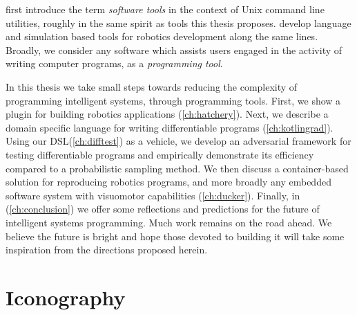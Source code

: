 %
\citet{kernighan1976software} first introduce the term \textit{software tools} in the context of Unix command line utilities, roughly in the same spirit as tools this thesis proposes. \citet{thrun2000towards, erez2015simulation} develop language and simulation based tools for robotics development along the same lines. Broadly, we consider any software which assists users engaged in the activity of writing computer programs, as a \textit{programming tool}.

In this thesis we take small steps towards reducing the complexity of programming intelligent systems, through programming tools. First, we show a plugin for building robotics applications (\autoref{ch:hatchery}). Next, we describe a domain specific language for writing differentiable programs (\autoref{ch:kotlingrad}). Using our DSL(\autoref{ch:difftest}) as a vehicle, we develop an adversarial framework for testing differentiable programs and empirically demonstrate its efficiency compared to a probabilistic sampling method. We then discuss a container-based solution for reproducing robotics programs, and more broadly any embedded software system with visuomotor capabilities (\autoref{ch:ducker}). Finally, in (\autoref{ch:conclusion}) we offer some reflections and predictions for the future of intelligent systems programming. Much work remains on the road ahead. We believe the future is bright and hope those devoted to building it will take some inspiration from the directions proposed herein.

\section{Iconography}


